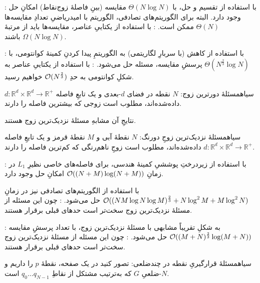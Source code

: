         : با استفاده از تقسیم و حل، با 
        $\Theta(N \log N)$ 
        مقایسه (بینِ فاصلهٔ زوج‌نقاط)
        امکانِ حل وجود دارد.
        البته برای الگوریتم‌های تصادفی، الگوریتم با امیدریاضیِ تعدادِ مقایسه‌ها
        $\Theta(N)$
        ممکن است.
        : با استفاده از یکتاییِ عناصر، مقایسه‌ها باید از مرتبهٔ
        $\Omega(N \log N)$
        باشند.

        : با استفاده از کاهش (با سربارِ لگاریتمی) به الگوریتمِ پیدا کردنِ کمینهٔ کوانتومی، با
        $\Theta(N^{\frac{2}{3}} \log N)$
        پرسشِ مقایسه، مسئله حل می‌شود.
        : با استفاده از یکتاییِ عناصر به شکلِ کوانتومی به حدِ
        $\mathcal{O}(N^{\frac{2}{3}})$
        خواهیم رسید.

    ‌سیاه{مسئلهٔ دورترین زوج}: 
    \(N\)
    نقطه در فضای \(d\)-بعدی و یک تابعِ فاصله 
    \(d: \mathbb{R}^d \times \mathbb{R}^d \to \mathbb{R}^+\)
    داده‌شده‌اند، مطلوب است زوجی که بیشترین فاصله را دارند.
     
    نتایجِ آن مشابهِ مسئلهٔ نزدیک‌ترین زوج هستند.

    ‌سیاه{مسئلهٔ نزدیک‌ترین زوجِ دورنگ}: 
    $N$
    نقطهٔ آبی و $M$ نقطهٔ قرمز و یک تابعِ فاصله 
    \(d: \mathbb{R}^d \times \mathbb{R}^d \to \mathbb{R}^+\)
    داده‌شده‌اند، مطلوب است زوجِ ناهم‌رنگی که کم‌ترین فاصله را دارند. \cite[]{kao}

        : با استفاده از زیردرختِ پوششیِ کمینهٔ هندسی، برای فاصله‌های خاصی نظیرِ $L_1$ در زمانِ 
        $\mathcal{O}((N+M) \log (N+M))$
         امکانِ حل وجود دارد.

        با استفاده از الگوریتم‌های تصادفی نیز در زمانِ
        $\mathcal{O}((NM \log N\log M)^\frac{2}{3}+N\log^2M+M\log^2N)$
        حل می‌شود.
        : چون این مسئله از مسئلهٔ نزدیک‌ترین زوج سخت‌تر است حدهای قبلی برقرار هستند.

        : به شکلِ تقریباً مشابهی با مسئلهٔ نزدیک‌ترین زوج، با تعداد پرسشِ مقایسه
        $\mathcal{O}((M+N)^{\frac{2}{3}} \log (M+N))$
        حل می‌شود.
        : چون این مسئله از مسئلهٔ نزدیک‌ترین زوج سخت‌تر است حدهای قبلی برقرار هستند.




‌سیاه{مسئلهٔ قرارگیریِ نقطه در چندضلعی}: تصور کنید در یک صفحه، نقطهٔ 
\(p\)
را داریم و \(N\)-ضلعیِ 
\(G\)
که به‌ترتیب مشتکل از نقاطِ 
\(q_0 \dots q_{N-1}\)
است. 

